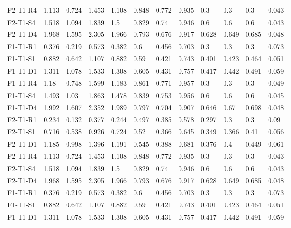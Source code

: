 \begin{table}[ht]
\begin{tabular}{llllllllllll}
     F2-T1-R4     & 1.113 & 0.724 & 1.453 & 1.108 & 0.848 & 0.772 & 0.935 & 0.3 & 0.3 & 0.3 & 0.043 \\ 
     F2-T1-S4     & 1.518 & 1.094 & 1.839 & 1.5 & 0.829 & 0.74 & 0.946 & 0.6 & 0.6 & 0.6 & 0.043 \\ 
     F2-T1-D4     & 1.968 & 1.595 & 2.305 & 1.966 & 0.793 & 0.676 & 0.917 & 0.628 & 0.649 & 0.685 & 0.048 \\ 
     F1-T1-R1     & 0.376 & 0.219 & 0.573 & 0.382 & 0.6 & 0.456 & 0.703 & 0.3 & 0.3 & 0.3 & 0.073 \\ 
     F1-T1-S1     & 0.882 & 0.642 & 1.107 & 0.882 & 0.59 & 0.421 & 0.743 & 0.401 & 0.423 & 0.464 & 0.051 \\ 
     F1-T1-D1     & 1.311 & 1.078 & 1.533 & 1.308 & 0.605 & 0.431 & 0.757 & 0.417 & 0.442 & 0.491 & 0.059 \\ 
     F1-T1-R4     & 1.18 & 0.748 & 1.599 & 1.183 & 0.861 & 0.771 & 0.957 & 0.3 & 0.3 & 0.3 & 0.049 \\ 
     F1-T1-S4     & 1.493 & 1.03 & 1.863 & 1.478 & 0.839 & 0.753 & 0.956 & 0.6 & 0.6 & 0.6 & 0.045 \\ 
     F1-T1-D4     & 1.992 & 1.607 & 2.352 & 1.989 & 0.797 & 0.704 & 0.907 & 0.646 & 0.67 & 0.698 & 0.048 \\ 
     F2-T1-R1     & 0.234 & 0.132 & 0.377 & 0.244 & 0.497 & 0.385 & 0.578 & 0.297 & 0.3 & 0.3 & 0.09 \\ 
     F2-T1-S1     & 0.716 & 0.538 & 0.926 & 0.724 & 0.52 & 0.366 & 0.645 & 0.349 & 0.366 & 0.41 & 0.056 \\ 
     F2-T1-D1     & 1.185 & 0.998 & 1.396 & 1.191 & 0.545 & 0.388 & 0.681 & 0.376 & 0.4 & 0.449 & 0.061 \\ 
     F2-T1-R4     & 1.113 & 0.724 & 1.453 & 1.108 & 0.848 & 0.772 & 0.935 & 0.3 & 0.3 & 0.3 & 0.043 \\ 
     F2-T1-S4     & 1.518 & 1.094 & 1.839 & 1.5 & 0.829 & 0.74 & 0.946 & 0.6 & 0.6 & 0.6 & 0.043 \\ 
     F2-T1-D4     & 1.968 & 1.595 & 2.305 & 1.966 & 0.793 & 0.676 & 0.917 & 0.628 & 0.649 & 0.685 & 0.048 \\ 
     F1-T1-R1     & 0.376 & 0.219 & 0.573 & 0.382 & 0.6 & 0.456 & 0.703 & 0.3 & 0.3 & 0.3 & 0.073 \\ 
     F1-T1-S1     & 0.882 & 0.642 & 1.107 & 0.882 & 0.59 & 0.421 & 0.743 & 0.401 & 0.423 & 0.464 & 0.051 \\ 
     F1-T1-D1     & 1.311 & 1.078 & 1.533 & 1.308 & 0.605 & 0.431 & 0.757 & 0.417 & 0.442 & 0.491 & 0.059 \\ 

\end{tabular}
\end{table}
